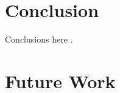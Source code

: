 \documentclass[11pt]{article}
\begin{document}
\section{Conclusion}
\label{sec:conclusion}

Conclusions here \cite{freebsd} \cite{unix}.

\section{Future Work}
\label{sec:future}


\onecolumn
\begin{sloppypar}
	
	
\end{sloppypar}

\end{document}
